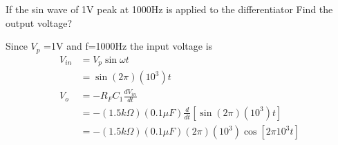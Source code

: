 \begin{enumerate}
\begin{answer}
	\end{answer}
	\begin{minipage}{\textwidth}
		\item If the sin wave of 1V peak at 1000Hz is applied to the differentiator Find the output voltage?
	\end{minipage}
	\begin{answer}
		Since $V_p$ =1V and f=1000Hz the input voltage is 
		\begin{align*}
		V_{in}&=V_p\sin \omega t\\
		&=\sin (2\pi)(10^3)t\\
		V_o&=-R_FC_1\frac{dV_{in}}{dt}\\
		&=-(1.5k\Omega)(0.1\mu F)\frac{d}{dt}\left[ \sin (2\pi)(10^3)t\right]\\ 
		&=-(1.5k\Omega)(0.1\mu F)(2\pi)(10^3)\cos \left[ 2\pi 10^3t\right] 
		\end{align*}
		
	\end{answer}
	

\end{enumerate}
